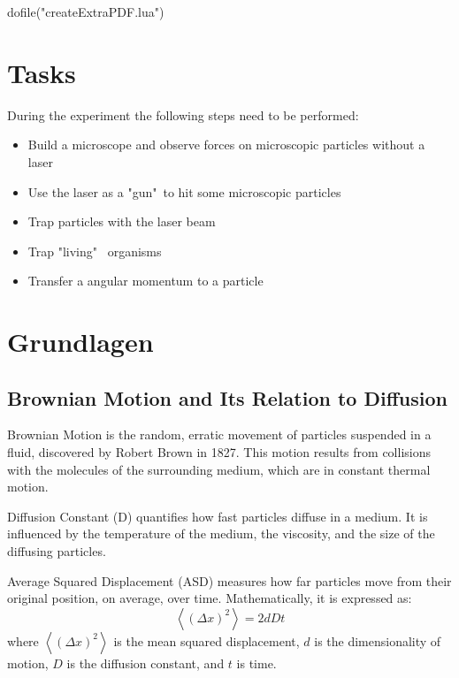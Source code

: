 \documentclass[12pt,english,ngerman]{scrartcl}
\begin{document}
\begin{luacode*}
dofile("createExtraPDF.lua")
\end{luacode*}


\tableofcontents

\newpage

\section{Tasks}\label{Auf}

During the experiment the following steps need to be performed:

\begin{itemize}
	\item Build a microscope and observe forces on microscopic particles without a laser
	\item Use the laser as a "gun"\ to hit some microscopic particles
	\item Trap particles with the laser beam
	\item Trap "living" \ organisms
	\item Transfer a angular momentum to a particle
\end{itemize}

\section{Grundlagen}\label{Grund}


\subsection{Brownian Motion and Its Relation to Diffusion}

Brownian Motion is the random, erratic movement of particles suspended in a
fluid, discovered by Robert Brown in 1827. This motion results from collisions
with the molecules of the surrounding medium, which are in constant thermal
motion.

Diffusion Constant (D) quantifies how fast particles diffuse in a medium. It is
influenced by the temperature of the medium, the viscosity, and the size of the
diffusing particles.

Average Squared Displacement (ASD) measures how far particles move from their
original position, on average, over time. Mathematically, it is expressed as:
\begin{equation}
	\left \langle (\Delta x)^2 \right \rangle = 2 d D t
	\label{eq:brownian_motion_diffusion}
\end{equation}
where $\left \langle (\Delta x)^2 \right \rangle$ is the mean squared displacement,
$d$ is the dimensionality of motion, $D$ is the diffusion constant, and $t$ is
time.
\end{document}

